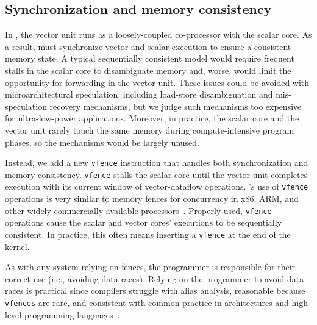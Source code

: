 \subsection[Synchronization and memory consistency]{Synchronization and memory consistency}

In \manic, the vector unit runs as a loosely-coupled co-processor with
the scalar core.
As a result, \manic must synchronize vector and scalar execution
to ensure a consistent memory state.
%
A typical sequentially consistent model would require frequent stalls in the scalar core to disambiguate memory and, worse, would limit the opportunity for forwarding in the vector unit.
%
These issues could be avoided with microarchitectural speculation, including load-store disambiguation and mis-speculation recovery mechanisms, but we judge such mechanisms too expensive for ultra-low-power applications.
% 
Moreover, in practice, the scalar core and the vector unit rarely touch the same memory during compute-intensive program phases,
so the mechanisms would be largely unused.

Instead, we add a new {\tt vfence} instruction that handles both synchronization and memory consistency.
%
{\tt vfence} stalls the scalar core until the vector unit completes execution with its current window of vector-dataflow operations. 
% 
\manic's use of {\tt vfence} operations is
very similar to memory fences for concurrency in x86, ARM, and other widely
commercially available processors~\cite{hsa}.  
% 
Properly used, {\tt vfence} operations
cause the scalar and vector cores' executions to be sequentially consistent.
%
In practice, this often means inserting a {\tt vfence} at the end of the kernel.

As with any system relying on fences, the programmer is responsible for their
correct use (i.e., avoiding data races).
% 
Relying on the programmer to avoid data races is
practical since compilers struggle with alias analysis,
reasonable because {\tt vfences} are rare,
and consistent with common practice in architectures
and high-level programming languages~\cite{cppspec,javamm}.

